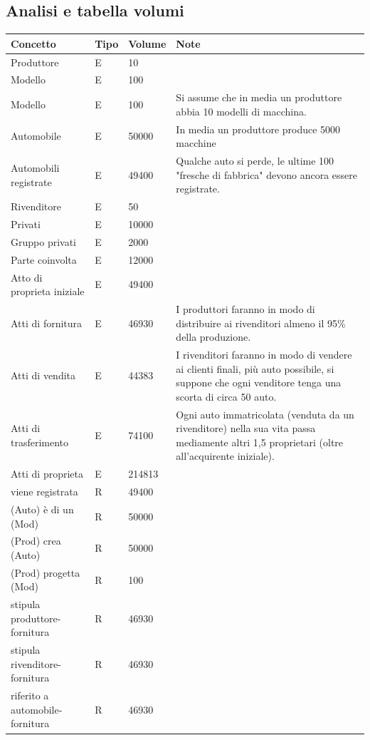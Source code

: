 \documentclass{report} %
\begin{document}
\subsection{Analisi e tabella volumi}
\begin{table}[h!]
\begin{tabular}{|l|l|l|l|}
\hline
Concetto & Tipo & Volume & Note \\
\hline
Produttore & E & 10 & \\
Modello & E & 100 & \\
Modello	& E	& 100 &Si assume che in media un produttore abbia 10 modelli di macchina. \\				
Automobile & E & 50000 & In media un produttore produce 5000 macchine \\				
Automobili registrate & E & 49400 & Qualche auto si perde, le ultime 100 "fresche di fabbrica" devono ancora essere registrate. \\			
Rivenditore	& E & 50 & \\					
Privati & E	& 10000	& \\				
Gruppo privati & E & 2000 & \\					
Parte coinvolta & E & 12000	& \\					
Atto di proprieta iniziale & E & 49400 & \\						
Atti di fornitura & E & 46930 & I produttori faranno in modo di distribuire ai rivenditori almeno il 95\% della produzione. \\					
Atti di vendita & E & 44383 & I rivenditori faranno in modo di vendere ai clienti finali, più auto possibile, si suppone che ogni venditore tenga una scorta di circa 50 auto. \\			
Atti di trasferimento & E & 74100 & Ogni auto immatricolata (venduta da un rivenditore) nella sua vita passa mediamente altri 1,5 proprietari (oltre all'acquirente iniziale). \\				
Atti di proprieta & E & 214813 & \\						
viene registrata & R & 49400 & \\						
(Auto) è di un (Mod) & R & 50000 & \\					
(Prod) crea (Auto) & R & 50000 & \\					
(Prod) progetta (Mod) & R & 100	& \\					
stipula produttore-fornitura & R & 46930 & \\						
stipula rivenditore-fornitura & R & 46930 & \\						
riferito a automobile-fornitura & R & 46930	& \\					

\end{tabular}
\end{table}
\end{document}
